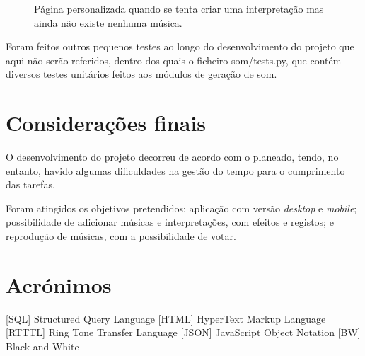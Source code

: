 \documentclass{report}
\begin{document}
\begin{figure}[htp]
\centering
{}
\caption{Página personalizada quando se tenta criar uma interpretação mas ainda não existe nenhuma música.}
\label{empty}
\end{figure}

Foram feitos outros pequenos testes ao longo do desenvolvimento do projeto que aqui não serão referidos, dentro dos quais o ficheiro som/tests.py, que contém diversos testes unitários feitos aos módulos de geração de som.

\chapter{Considerações finais}
\label{chap.finais}

O desenvolvimento do projeto decorreu de acordo com o planeado, tendo, no entanto, havido algumas dificuldades na gestão do tempo para o cumprimento das tarefas.

Foram atingidos os objetivos pretendidos: aplicação com versão \emph{desktop} e \emph{mobile}; possibilidade de adicionar músicas e interpretações, com efeitos e registos; e reprodução de músicas, com a possibilidade de votar.


\chapter*{Acrónimos}
\begin{acronym}
[SQL] {Structured Query Language}
 [HTML] {HyperText Markup Language}
 [RTTTL] {Ring Tone Transfer Language}
 [JSON] {JavaScript Object Notation}
 [BW] {Black and White}

\end{acronym}


\printbibliography
\end{document}
